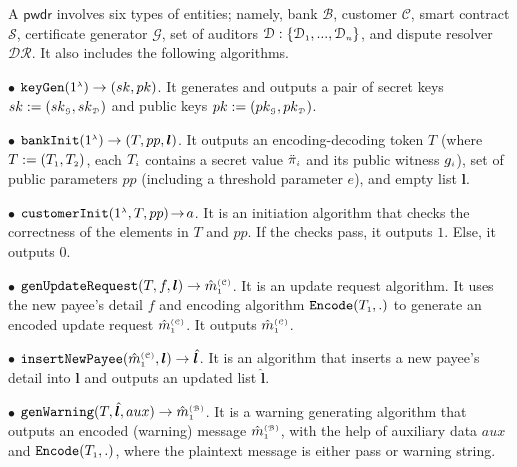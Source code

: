 \begin{definition}\label{def-a::sytax} A $\mathsf{pwdr}$    involves six   types of entities; namely,  bank $\mathcal{B}$, customer $\mathcal{C}$,  smart contract $\mathcal{S}$,  certificate generator $\mathcal{G}$,   set of auditors $\mathcal{D}:\{\mathcal{D}_{\scriptscriptstyle 1},..., \mathcal{D}_{\scriptscriptstyle n}\}$, and  dispute resolver $\mathcal{DR}$. It also includes the following    algorithms.  

%


\item [$\bullet$]  $\mathtt{keyGen}(1^{\scriptscriptstyle \lambda})\rightarrow (sk,pk)$. It  generates and outputs a pair of secret keys $sk:=(sk_{\scriptscriptstyle\mathcal {G}},sk_{\scriptscriptstyle\mathcal {D}})$ and public keys $pk:=(pk_{\scriptscriptstyle\mathcal {G}},pk_{\scriptscriptstyle\mathcal {D}})$. 
%
\item[$\bullet$] $\mathtt{bankInit}(1^{\scriptscriptstyle \lambda})\rightarrow (T, pp, \bm{l})$. It  outputs an encoding-decoding token $T$ (where  $T:=(T_{\scriptscriptstyle 1},T_{\scriptscriptstyle 2})$,  each $T_{\scriptscriptstyle i}$  contains  a secret value $\ddot\pi_{\scriptscriptstyle i}$ and its  public witness $g_{\scriptscriptstyle i}$),  set of  public parameters  $pp$  (including a threshold parameter $e$),  and    empty list $\bm{l}$.
%
\item[$\bullet$] $\mathtt{customerInit} (1^{\scriptscriptstyle \lambda}, T, pp)\hspace{-.5mm}\rightarrow\hspace{-.5mm} a$. It is an   initiation algorithm that checks the correctness of the elements in $T$ and $pp$. If the checks pass, it outputs $1$. Else, it outputs $0$. 
%
\item [$\bullet$] $\mathtt{genUpdateRequest}(T, f, {\bm l})\rightarrow \hat m^{\scriptscriptstyle\mathcal{(C)}}_{\scriptscriptstyle 1}$.  It is an update request  algorithm. It uses the new payee's detail $f$ and encoding algorithm $\mathtt{Encode}(T_{\scriptscriptstyle 1},.)$ to generate an encoded update request $\hat  m^{\scriptscriptstyle\mathcal{(C)}}_{\scriptscriptstyle 1}$.  It outputs  $\hat  m^{\scriptscriptstyle\mathcal{(C)}}_{\scriptscriptstyle 1}$.
%
\item [$\bullet$] $\mathtt{insertNewPayee}(\hat{m}^{\scriptscriptstyle\mathcal{(C)}}_{\scriptscriptstyle 1}, {\bm l})\rightarrow  \hat{\bm l}$. It is  an algorithm that inserts a new payee's detail into ${\bm l}$ and outputs an updated list $\hat{\bm l}$.
%
\item  [$\bullet$] $\mathtt{genWarning}(T, \hat{\bm l}, {aux})\rightarrow \hat m^{\scriptscriptstyle\mathcal{(B)}}_{\scriptscriptstyle1}$. It is a warning generating algorithm that outputs an encoded (warning) message $\hat m^{\scriptscriptstyle\mathcal{(B)}}_{\scriptscriptstyle1}$, with the help of auxiliary data ${aux}$ and $\mathtt{Encode}(T_{\scriptscriptstyle 1},.)$, where the plaintext message is either pass or warning string. 

\end{definition}
